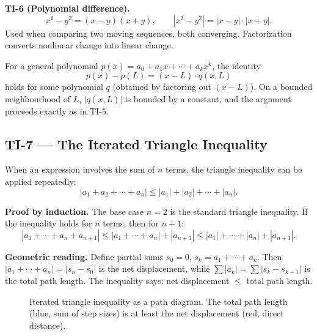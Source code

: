 \medskip

\textbf{TI-6 (Polynomial difference).}
\[
  x^2 - y^2 = (x-y)(x+y),
  \qquad
  |x^2 - y^2| = |x-y| \cdot |x+y|.
\]
Used when comparing two moving sequences, both converging.
Factorization converts nonlinear change into linear change.

\begin{remark*}
For a general polynomial $p(x) = a_0 + a_1 x + \cdots + a_k x^k$,
the identity
\[
  p(x) - p(L) = (x-L) \cdot q(x,L)
\]
holds for some polynomial $q$ (obtained by factoring out $(x-L)$).
On a bounded neighbourhood of $L$, $|q(x,L)|$ is bounded by a
constant, and the argument proceeds exactly as in TI-5.
\end{remark*}

\subsection{TI-7 — The Iterated Triangle Inequality}

When an expression involves the sum of $n$ terms, the triangle
inequality can be applied repeatedly:
\[
  |a_1 + a_2 + \cdots + a_n|
  \le |a_1| + |a_2| + \cdots + |a_n|.
\]

\textbf{Proof by induction.}
The base case $n = 2$ is the standard triangle inequality.
If the inequality holds for $n$ terms, then for $n+1$:
\[
  |a_1 + \cdots + a_n + a_{n+1}|
  \le |a_1 + \cdots + a_n| + |a_{n+1}|
  \le |a_1| + \cdots + |a_n| + |a_{n+1}|.
\]

\textbf{Geometric reading.}
Define partial sums $s_0 = 0$, $s_k = a_1 + \cdots + a_k$.
Then $|a_1 + \cdots + a_n| = |s_n - s_0|$ is the net displacement,
while $\sum |a_k| = \sum |s_k - s_{k-1}|$ is the total path length.
The inequality says: net displacement $\le$ total path length.

\begin{figure}[h]
\centering
{}
\caption{Iterated triangle inequality as a path diagram.
The total path length (blue, sum of step sizes) is at least
the net displacement (red, direct distance).}
\end{figure}

